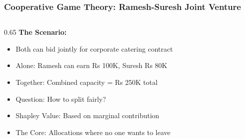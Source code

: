 \begin{frame}[fragile]\frametitle{Cooperative Game Theory: Ramesh-Suresh Joint Venture}
\begin{columns}
    \begin{column}[T]{0.65\linewidth}
      \textbf{The Scenario:}
      \begin{itemize}
        \item Both can bid jointly for corporate catering contract
        \item Alone: Ramesh can earn Rs 100K, Suresh Rs 80K
        \item Together: Combined capacity = Rs 250K total
        \item Question: How to split fairly?
        \item Shapley Value: Based on marginal contribution
        \item The Core: Allocations where no one wants to leave
      \end{itemize}
      

\end{column}
\end{columns}
\end{frame}
